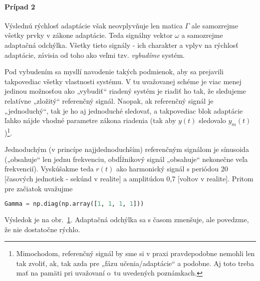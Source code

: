 \documentclass[a4paper, 10pt, ]{article}
\begin{document}
\paragraph{Prípad 2}

Výslednú rýchlosť adaptácie však neovplyvňuje len matica $\Gamma$ ale samozrejme všetky prvky v zákone adaptácie. Teda signálny vektor $\omega$ a samozrejme adaptačná odchýlka. Všetky tieto signály - ich charakter a vplyv na rýchlosť adaptácie, závisia od toho ako veľmi tzv. \emph{vybudíme} systém.


Pod vybudením sa mysllí navodenie takých podmienok, aby sa prejavili takpovediac všetky vlastnosti systému. V tu uvažovanej schéme je viac menej jedinou možnosťou ako „vybudiť“ riadený systém je riadiť ho tak, že sledujeme relatívne „zložitý“ referenčný signál. Naopak, ak referenčný signál je „jednoduchý“, tak je ho aj jednoduché sledovať, a takpovediac blok adaptácie ľahko nájde vhodné parametre zákona riadenia (tak aby $y(t)$ sledovalo $y_m(t)$)\footnote{Mimochodom, referenčný signál by sme si v praxi pravdepodobne nemohli len tak zvoliť, ak, tak azda pre „fázu učenia/adaptácie“ a podobne. Aj toto treba mať na pamäti pri uvažovaní o~tu uvedených poznámkach.}.

Jednoduchým (v princípe najjdednoduchším) referenčným signálom je sínusoida („obsahuje“ len jednu frekvenciu, obdĺžnikový signál „obsahuje“ nekonečne veľa frekvencií). Vyskúšakme teda $r(t)$ ako harmonický signál s periódou 20 [časových jednotiek - sekúnd v realite] a amplitúdou 0,7 [voltov v realite]. Pritom pre začiatok uvažujme
\begin{lstlisting}[language=Python,
                    numbers=none,
                    ]
Gamma = np.diag(np.array([1, 1, 1, 1]))
\end{lstlisting}
Výsledok je na obr.~\ref{figsc_ar06_MRAC_3}. Adaptačná odchýlka sa s časom  zmenšuje, ale povedzme, že nie dostatočne rýchlo.






\begin{figure}[!b]
	\centering

    \vspace{-3mm}


    \vspace{-2mm}

	\caption{}
	\label{figsc_ar06_MRAC_3}


    \vspace{-2mm}

\end{figure}
\end{document}
